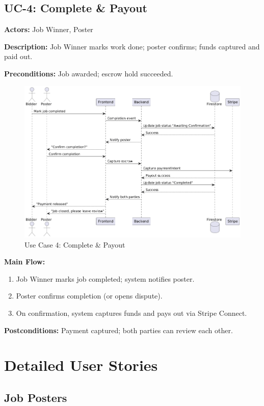 \documentclass[11pt]{article}
\begin{document}
\subsection{UC-4: Complete \& Payout}
\textbf{Actors:} Job Winner, Poster \par
\textbf{Description:} Job Winner marks work done; poster confirms; funds captured and paid out.\par
\textbf{Preconditions:} Job awarded; escrow hold succeeded.\par
\begin{figure}[htbp]
  \centering
\includegraphics[width=0.9\linewidth]{UC-4.png}
  \caption{Use Case 4: Complete \& Payout}
  \label{fig:uc4}
\end{figure} \par
\textbf{Main Flow:}
\begin{enumerate}[leftmargin=1.4em]
  \item Job Winner marks job completed; system notifies poster.
  \item Poster confirms completion (or opens dispute).
  \item On confirmation, system captures funds and pays out via Stripe Connect.
\end{enumerate}
\textbf{Postconditions:} Payment captured; both parties can review each other.

\section{Detailed User Stories}

\subsection*{Job Posters}
\end{document}
